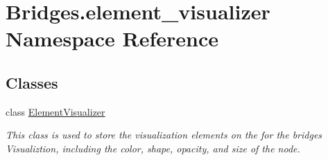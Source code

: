 \hypertarget{namespace_bridges_1_1element__visualizer}{}\section{Bridges.\+element\+\_\+visualizer Namespace Reference}
\label{namespace_bridges_1_1element__visualizer}
\subsection*{Classes}
\begin{DoxyCompactItemize}
\item 
class \hyperlink{class_bridges_1_1element__visualizer_1_1_element_visualizer}{Element\+Visualizer}
\begin{DoxyCompactList}\small\item\em This class is used to store the visualization elements on the for the bridges Visualiztion, including the color, shape, opacity, and size of the node. \end{DoxyCompactList}\end{DoxyCompactItemize}
